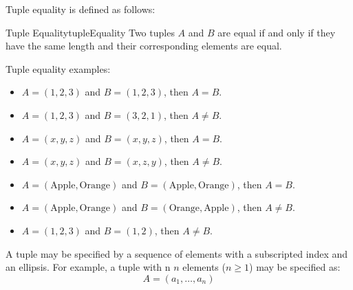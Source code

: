 Tuple equality is defined as follows:
\begin{definition}{Tuple Equality}{tupleEquality}
  Two tuples \( A \) and \( B \) are equal if and only if they have the same length and 
  their corresponding elements are equal.
\end{definition}
Tuple equality examples:
\begin{itemize}
  \item \( A = (1, 2, 3) \) and \( B = (1, 2, 3) \), then \( A = B \).
  \item \( A = (1, 2, 3) \) and \( B = (3, 2, 1) \), then \( A \neq B \).
  \item \( A = (x, y, z) \) and \( B = (x, y, z) \), then \( A = B \).
  \item \( A = (x, y, z) \) and \( B = (x, z, y) \), then \( A \neq B \).
  \item \( A = (\text{Apple}, \text{Orange}) \) and \( B = (\text{Apple}, \text{Orange}) \), then \( A = B \).
  \item \( A = (\text{Apple}, \text{Orange}) \) and \( B = (\text{Orange}, \text{Apple}) \), then \( A \neq B \).
  \item \( A = (1, 2, 3) \) and \( B = (1, 2) \), then \( A \neq B \).
\end{itemize}

A tuple may be specified by a sequence of elements with a subscripted index and an ellipsis. 
For example, a tuple with n
\(n\) elements (\( n \ge 1\)) may be specified as:
\[
  A = (a_1, \ldots, a_n) 
\]
